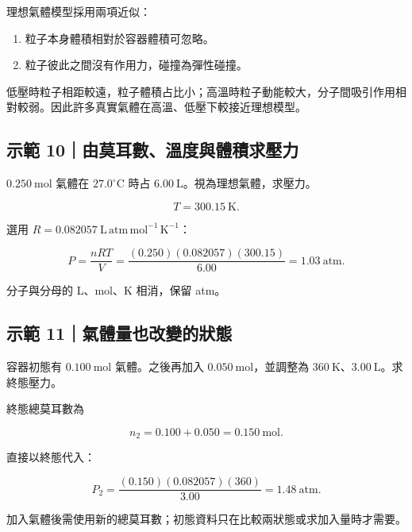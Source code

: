 \documentclass[11pt,a4paper]{article}
\providecommand{\tightlist}{%
  \setlength{\itemsep}{0pt}\setlength{\parskip}{0pt}}
\begin{document}
理想氣體模型採用兩項近似：

\begin{enumerate}
\def\labelenumi{\arabic{enumi}.}
\tightlist
\item
  粒子本身體積相對於容器體積可忽略。
\item
  粒子彼此之間沒有作用力，碰撞為彈性碰撞。
\end{enumerate}

低壓時粒子相距較遠，粒子體積占比小；高溫時粒子動能較大，分子間吸引作用相對較弱。因此許多真實氣體在高溫、低壓下較接近理想模型。

\begin{HandoutWorkedExample}

\subsection{示範 10｜由莫耳數、溫度與體積求壓力}\label{ux793aux7bc4-10ux7531ux83abux8033ux6578ux6eabux5ea6ux8207ux9ad4ux7a4dux6c42ux58d3ux529b}

\(0.250\ \mathrm{mol}\) 氣體在 \(27.0^\circ\mathrm C\) 時占 \(6.00\ \mathrm L\)。視為理想氣體，求壓力。

\[
T=300.15\ \mathrm K.
\]

選用 \(R=0.082057\ \mathrm{L\,atm\,mol^{-1}\,K^{-1}}\)：

\[
P=\frac{nRT}{V}
=\frac{(0.250)(0.082057)(300.15)}{6.00}
=1.03\ \mathrm{atm}.
\]

分子與分母的 L、mol、K 相消，保留 atm。

\end{HandoutWorkedExample}

\begin{HandoutWorkedExample}

\subsection{示範 11｜氣體量也改變的狀態}\label{ux793aux7bc4-11ux6c23ux9ad4ux91cfux4e5fux6539ux8b8aux7684ux72c0ux614b}

容器初態有 \(0.100\ \mathrm{mol}\) 氣體。之後再加入 \(0.050\ \mathrm{mol}\)，並調整為 \(360\ \mathrm K\)、\(3.00\ \mathrm L\)。求終態壓力。

終態總莫耳數為

\[
n_2=0.100+0.050=0.150\ \mathrm{mol}.
\]

直接以終態代入：

\[
P_2=\frac{(0.150)(0.082057)(360)}{3.00}=1.48\ \mathrm{atm}.
\]

加入氣體後需使用新的總莫耳數；初態資料只在比較兩狀態或求加入量時才需要。

\end{HandoutWorkedExample}
\end{document}
